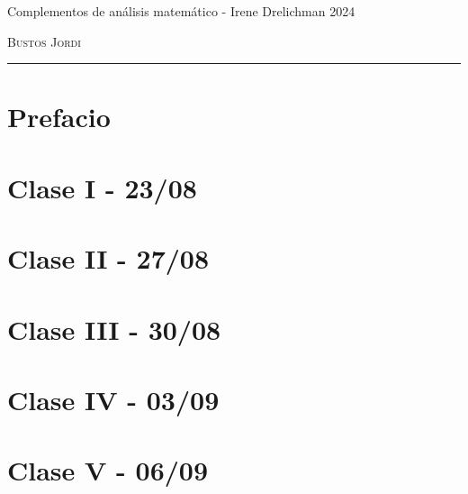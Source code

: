 \documentclass[12pt,a4paper]{book}
\begin{document}
\renewcommand{\contentsname}{\vspace{0cm} Contenido \vspace{-2cm}}

\begin{titlepage}
	\vspace*{2cm}

	\noindent
	\vspace*{0.5cm}

	\vspace{1.5cm}
	\epigraph{Complementos de análisis matemático - Irene Drelichman 2024}%
	{\textsc{Bustos Jordi}}
	\null\vfill
	\vspace*{1cm}
	\noindent
	\hfill
	\begin{minipage}{0.7\linewidth}
		\begin{flushright}
			\printauthor
		\end{flushright}
	\end{minipage}
	\begin{minipage}{0.02\linewidth}
		\rule{1pt}{70pt}
	\end{minipage}
	\titlepagedecoration
\end{titlepage}

\let\cleardoublepage=\clearpage
\tableofcontents
\blankpage

\chapter*{Prefacio}


\chapter{Clase I - 23/08 }


\chapter{Clase II - 27/08}


\chapter{Clase III - 30/08}


\chapter{Clase IV - 03/09}


\chapter{Clase V - 06/09}

\end{document}
